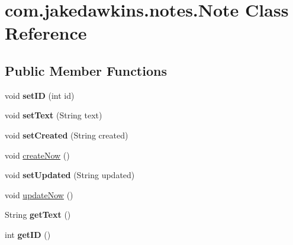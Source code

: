 \hypertarget{classcom_1_1jakedawkins_1_1notes_1_1_note}{}\section{com.\+jakedawkins.\+notes.\+Note Class Reference}
\label{classcom_1_1jakedawkins_1_1notes_1_1_note}
\subsection*{Public Member Functions}
\begin{DoxyCompactItemize}
\item 
void {\bfseries set\+ID} (int id)\hypertarget{classcom_1_1jakedawkins_1_1notes_1_1_note_a876432b6d8ebdefe19913e56e25a7f55}{}\label{classcom_1_1jakedawkins_1_1notes_1_1_note_a876432b6d8ebdefe19913e56e25a7f55}

\item 
void {\bfseries set\+Text} (String text)\hypertarget{classcom_1_1jakedawkins_1_1notes_1_1_note_ac1e2f35722960be015d567988bee7ae8}{}\label{classcom_1_1jakedawkins_1_1notes_1_1_note_ac1e2f35722960be015d567988bee7ae8}

\item 
void {\bfseries set\+Created} (String created)\hypertarget{classcom_1_1jakedawkins_1_1notes_1_1_note_a09b6be123b9c33bc1232bb2f3fd095c3}{}\label{classcom_1_1jakedawkins_1_1notes_1_1_note_a09b6be123b9c33bc1232bb2f3fd095c3}

\item 
void \hyperlink{classcom_1_1jakedawkins_1_1notes_1_1_note_a3c1aa05b41c222b6225c4c17c27f2b6a}{create\+Now} ()
\item 
void {\bfseries set\+Updated} (String updated)\hypertarget{classcom_1_1jakedawkins_1_1notes_1_1_note_a64f269e798088cfbcd478706b740e876}{}\label{classcom_1_1jakedawkins_1_1notes_1_1_note_a64f269e798088cfbcd478706b740e876}

\item 
void \hyperlink{classcom_1_1jakedawkins_1_1notes_1_1_note_a244c89c05ab7d2664d648cf111ae994c}{update\+Now} ()
\item 
String {\bfseries get\+Text} ()\hypertarget{classcom_1_1jakedawkins_1_1notes_1_1_note_aa55302a567a3c1b0474bba551f5f1862}{}\label{classcom_1_1jakedawkins_1_1notes_1_1_note_aa55302a567a3c1b0474bba551f5f1862}

\item 
int {\bfseries get\+ID} ()\hypertarget{classcom_1_1jakedawkins_1_1notes_1_1_note_a41d768d733d99d3c876441cc335bd47c}{}\label{classcom_1_1jakedawkins_1_1notes_1_1_note_a41d768d733d99d3c876441cc335bd47c}


\end{DoxyCompactItemize}
